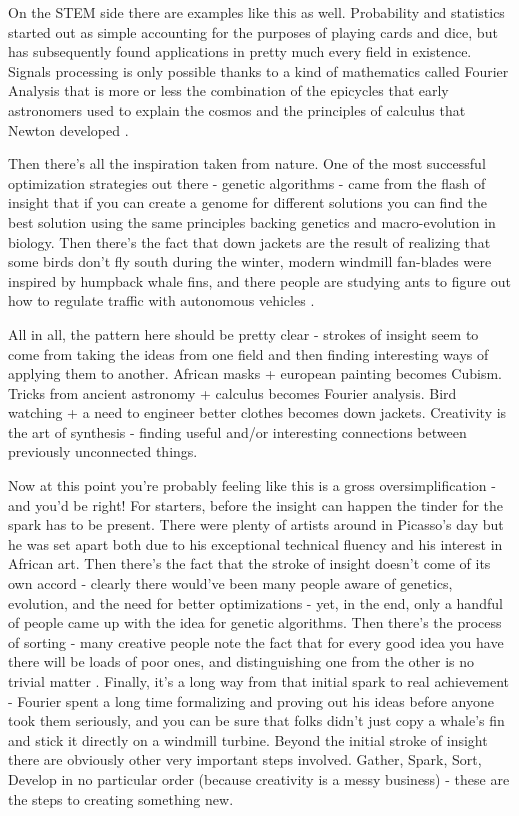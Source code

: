 \documentclass[11pt,a5paper]{book}
\begin{document}
On the STEM side there are examples like this as well. Probability and statistics started out as simple accounting for the purposes of playing cards and dice, but has subsequently found applications in pretty much every field in existence. Signals processing is only possible thanks to a kind of mathematics called Fourier Analysis that is more or less the combination of the epicycles that early astronomers used to explain the cosmos and the principles of calculus that Newton developed \cite{gnu}. 
\newline

Then there's all the inspiration taken from nature. One of the most successful optimization strategies out there - genetic algorithms - came from the flash of insight that if you can create a genome for different solutions you can find the best solution using the same principles backing genetics and macro-evolution in biology. Then there's the fact that down jackets are the result of realizing that some birds don't fly south during the winter, modern windmill fan-blades were inspired by humpback whale fins, and there people are studying ants to figure out how to regulate traffic with autonomous vehicles \cite{biomimicry}.
\newline

All in all, the pattern here should be pretty clear - strokes of insight seem to come from taking the ideas from one field and then finding interesting ways of applying them to another. African masks + european painting becomes Cubism. Tricks from ancient astronomy + calculus becomes Fourier analysis. Bird watching + a need to engineer better clothes becomes down jackets. Creativity is the art of synthesis - finding useful and/or interesting connections between previously unconnected things.
\newline 

Now at this point you're probably feeling like this is a gross oversimplification - and you'd be right! For starters, before the insight can happen the tinder for the spark has to be present. There were plenty of artists around in Picasso's day but he was set apart both due to his exceptional technical fluency and his interest in African art. Then there's the fact that the stroke of insight doesn't come of its own accord - clearly there would've been many people aware of genetics, evolution, and the need for better optimizations - yet, in the end, only a handful of people came up with the idea for genetic algorithms. Then there's the process of sorting - many creative people note the fact that for every good idea you have there will be loads of poor ones, and distinguishing one from the other is no trivial matter \cite{kaufman}. Finally, it's a long way from that initial spark to real achievement - Fourier spent a long time formalizing and proving out his ideas before anyone took them seriously, and you can be sure that folks didn't just copy a whale's fin and stick it directly on a windmill turbine. Beyond the initial stroke of insight there are obviously other very important steps involved. Gather, Spark, Sort, Develop in no particular order (because creativity is a messy business) - these are the steps to creating something new. 
\newline
\end{document}
